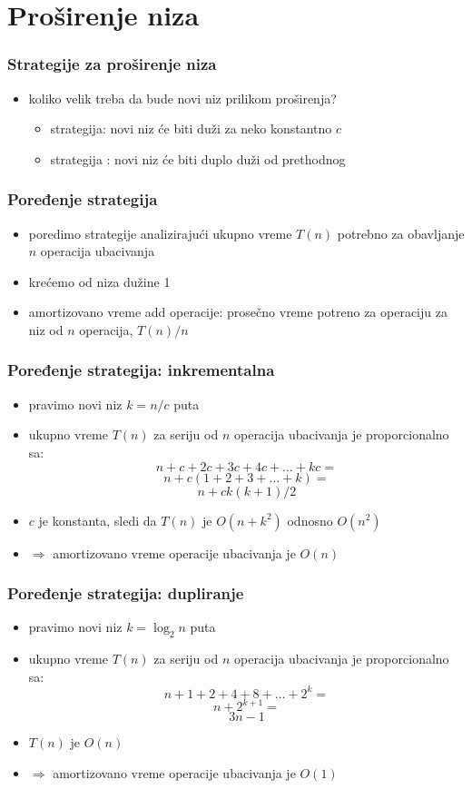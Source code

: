 \documentclass[compress]{beamer}
\begin{document}
\section[Proširenje]{Proširenje niza}
\begin{frame}[fragile]
  \frametitle{Strategije za proširenje niza}
  \begin{itemize}
    \item koliko velik treba da bude novi niz prilikom proširenja?
    \begin{itemize}
      \item {} strategija: novi niz će biti duži za neko
      konstantno $c$
      \item strategija : novi niz će biti duplo duži od
      prethodnog
    \end{itemize}
  \end{itemize}
\end{frame}

\begin{frame}[fragile]
  \frametitle{Poređenje strategija}
  \begin{itemize}
    \item poredimo strategije analizirajući ukupno vreme $T(n)$ potrebno za
    obavljanje $n$ operacija ubacivanja
    \item krećemo od niza dužine 1
    \item amortizovano vreme add operacije: prosečno vreme potreno za operaciju
    za niz od $n$ operacija, $T(n)/n$
  \end{itemize}
\end{frame}

\begin{frame}[fragile]
  \frametitle{Poređenje strategija: inkrementalna}
  \begin{itemize}
    \item pravimo novi niz $k = n/c$ puta
    \item ukupno vreme $T(n)$ za seriju od $n$ operacija ubacivanja je
    proporcionalno sa:
    $$ n + c + 2c + 3c + 4c + \ldots + kc = $$
    $$ n + c(1 + 2 + 3 + \ldots + k) = $$
    $$ n + ck(k+1)/2$$
    \item $c$ je konstanta, sledi da $T(n)$ je $O(n+k^2)$ odnosno $O(n^2)$
    \item $\Rightarrow$ amortizovano vreme operacije ubacivanja je $O(n)$
  \end{itemize}
\end{frame}

\begin{frame}[fragile]
  \frametitle{Poređenje strategija: dupliranje}
  \begin{itemize}
    \item pravimo novi niz $k = \log_2 n$ puta
    \item ukupno vreme $T(n)$ za seriju od $n$ operacija ubacivanja je
    proporcionalno sa:
    $$ n + 1 + 2 + 4 + 8 + \ldots + 2^k = $$
    $$ n + 2^{k+1} = $$
    $$ 3n - 1$$
    \item $T(n)$ je $O(n)$
    \item $\Rightarrow$ amortizovano vreme operacije ubacivanja je $O(1)$
  \end{itemize}
\end{frame}
\end{document}
